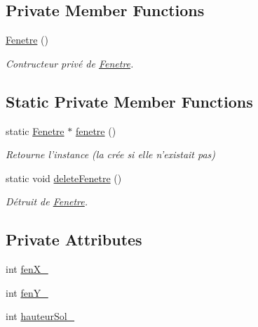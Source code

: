 \subsection*{Private Member Functions}
\begin{DoxyCompactItemize}
\item 
\hypertarget{classPropriete_1_1Fenetre_a3881f64375ead8ce8c11f7cf018bb37a}{\hyperlink{classPropriete_1_1Fenetre_a3881f64375ead8ce8c11f7cf018bb37a}{Fenetre} ()}\label{classPropriete_1_1Fenetre_a3881f64375ead8ce8c11f7cf018bb37a}

\begin{DoxyCompactList}\small\item\em Contructeur privé de \hyperlink{classPropriete_1_1Fenetre}{Fenetre}. \end{DoxyCompactList}\end{DoxyCompactItemize}
\subsection*{Static Private Member Functions}
\begin{DoxyCompactItemize}
\item 
static \hyperlink{classPropriete_1_1Fenetre}{Fenetre} $\ast$ \hyperlink{classPropriete_1_1Fenetre_acc68a6204ffe6bb750b368a5dbf56a67}{fenetre} ()
\begin{DoxyCompactList}\small\item\em Retourne l'instance (la crée si elle n'existait pas) \end{DoxyCompactList}\item 
\hypertarget{classPropriete_1_1Fenetre_a94455a31d69134d5f38c513e28dea87b}{static void \hyperlink{classPropriete_1_1Fenetre_a94455a31d69134d5f38c513e28dea87b}{delete\-Fenetre} ()}\label{classPropriete_1_1Fenetre_a94455a31d69134d5f38c513e28dea87b}

\begin{DoxyCompactList}\small\item\em Détruit de \hyperlink{classPropriete_1_1Fenetre}{Fenetre}. \end{DoxyCompactList}\end{DoxyCompactItemize}
\subsection*{Private Attributes}
\begin{DoxyCompactItemize}
\item 
int \hyperlink{classPropriete_1_1Fenetre_ab958f291fecae23304d6e60a32b6134f}{fen\-X\-\_\-}
\item 
int \hyperlink{classPropriete_1_1Fenetre_a0c6f0ef16ffa6f50c60cb275bcead8ef}{fen\-Y\-\_\-}
\item 
int \hyperlink{classPropriete_1_1Fenetre_ae462a2e277bbdb82ec51bf753c5bb2d2}{hauteur\-Sol\-\_\-}
\end{DoxyCompactItemize}
